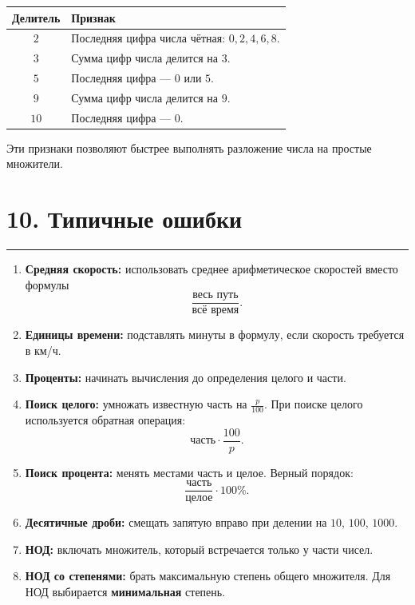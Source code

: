 \documentclass[a4paper,12pt]{article}
\newcommand{\sectionline}{%
    \vspace{0.2em}
    {\color{accent}\rule{\linewidth}{0.6pt}}
    \vspace{0.5em}
}
\begin{document}
\begin{center}
\begin{tabularx}{\linewidth}{@{}cX@{}}
\toprule
\textbf{Делитель} & \textbf{Признак} \\
\midrule

\(2\)
&
Последняя цифра числа чётная:
\(0,2,4,6,8\).
\\

\(3\)
&
Сумма цифр числа делится на \(3\).
\\

\(5\)
&
Последняя цифра --- \(0\) или \(5\).
\\

\(9\)
&
Сумма цифр числа делится на \(9\).
\\

\(10\)
&
Последняя цифра --- \(0\).
\\

\bottomrule
\end{tabularx}
\end{center}

Эти признаки позволяют быстрее выполнять разложение числа на простые множители.

\section*{\color{darkaccent}10. Типичные ошибки}
\sectionline

\begin{enumerate}[leftmargin=8mm,itemsep=5pt]

    \item
    \textbf{Средняя скорость:}
    использовать среднее арифметическое скоростей вместо формулы
    \[
    \frac{\text{весь путь}}{\text{всё время}}.
    \]

    \item
    \textbf{Единицы времени:}
    подставлять минуты в формулу, если скорость требуется в км/ч.

    \item
    \textbf{Проценты:}
    начинать вычисления до определения целого и части.

    \item
    \textbf{Поиск целого:}
    умножать известную часть на \(\frac{p}{100}\).
    При поиске целого используется обратная операция:
    \[
    \text{часть}\cdot\frac{100}{p}.
    \]

    \item
    \textbf{Поиск процента:}
    менять местами часть и целое.
    Верный порядок:
    \[
    \frac{\text{часть}}{\text{целое}}\cdot100\%.
    \]

    \item
    \textbf{Десятичные дроби:}
    смещать запятую вправо при делении на \(10\), \(100\), \(1000\).

    \item
    \textbf{НОД:}
    включать множитель, который встречается только у части чисел.

    \item
    \textbf{НОД со степенями:}
    брать максимальную степень общего множителя.
    Для НОД выбирается \textbf{минимальная} степень.
\end{enumerate}
\end{document}
